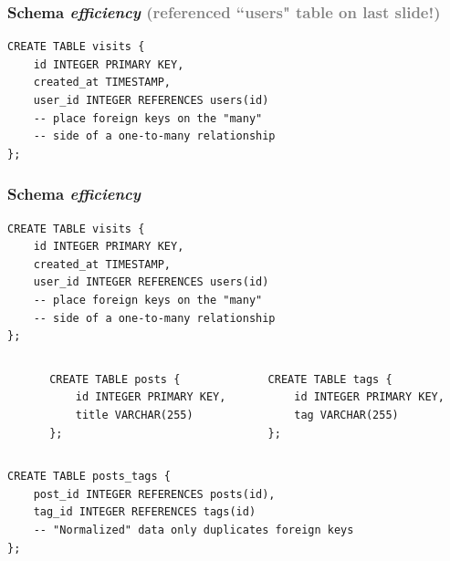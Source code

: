 \documentclass[xcolor={dvipsnames}]{beamer}
\begin{document}
\begin{frame}[fragile]\frametitle{Schema \emph{efficiency} \textcolor{gray}{(referenced ``users" table on last slide!)}}

\begin{verbatim}
CREATE TABLE visits {
    id INTEGER PRIMARY KEY,
    created_at TIMESTAMP,
    user_id INTEGER REFERENCES users(id)
    -- place foreign keys on the "many" 
    -- side of a one-to-many relationship
};
\end{verbatim}


\vspace{3in}

\end{frame}	




\begin{frame}[fragile]\frametitle{Schema \emph{efficiency}}

\begin{verbatim}
CREATE TABLE visits {
    id INTEGER PRIMARY KEY,
    created_at TIMESTAMP,
    user_id INTEGER REFERENCES users(id)
    -- place foreign keys on the "many" 
    -- side of a one-to-many relationship
};
\end{verbatim}


\begin{columns}
\begin{column}{.005\textwidth}
${}$
\end{column}
\begin{column}{.5\textwidth}
\color{blue}
\begin{verbatim}
CREATE TABLE posts {
    id INTEGER PRIMARY KEY,
    title VARCHAR(255)
};
\end{verbatim}
\end{column}
\begin{column}{.5\textwidth}
\color{blue}
\begin{verbatim}
CREATE TABLE tags {
    id INTEGER PRIMARY KEY,
    tag VARCHAR(255)
};
\end{verbatim}
\end{column}
\end{columns}


\begin{verbatim}
CREATE TABLE posts_tags {
    post_id INTEGER REFERENCES posts(id),
    tag_id INTEGER REFERENCES tags(id)
    -- "Normalized" data only duplicates foreign keys 
};
\end{verbatim}

\end{frame}	
\end{document}
